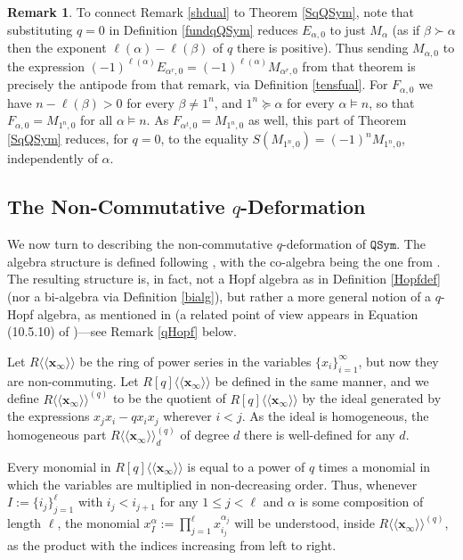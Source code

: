 \documentclass{article}
\theoremstyle{definition}
\newtheorem{rmk}[thm]{Remark}
\begin{document}
\begin{rmk}
To connect Remark \ref{shdual} to Theorem \ref{SqQSym}, note that substituting $q=0$ in Definition \ref{fundqQSym} reduces $E_{\alpha,0}$ to just $M_{\alpha}$ (as if $\beta\succ\alpha$ then the exponent $\ell(\alpha)-\ell(\beta)$ of $q$ there is positive). Thus sending $M_{\alpha,0}$ to the expression $(-1)^{\ell(\alpha)}E_{\alpha^{r},0}=(-1)^{\ell(\alpha)}M_{\alpha^{r},0}$ from that theorem is precisely the antipode from that remark, via Definition \ref{tensfual}. For $F_{\alpha,0}$ we have $n-\ell(\beta)>0$ for every $\beta\neq1^{n}$, and $1^{n}\succeq\alpha$ for every $\alpha \vDash n$, so that $F_{\alpha,0}=M_{1^{n},0}$ for all $\alpha \vDash n$. As $F_{\alpha^{t},0}=M_{1^{n},0}$ as well, this part of Theorem \ref{SqQSym} reduces, for $q=0$, to the equality $S(M_{1^{n},0})=(-1)^{n}M_{1^{n},0}$, independently of $\alpha$. \label{q0com}
\end{rmk}

\subsection{The Non-Commutative $q$-Deformation}

We now turn to describing the non-commutative $q$-deformation of $\mathtt{QSym}$. The algebra structure is defined following \cite{[TU]}, with the co-algebra being the one from \cite{[L]}. The resulting structure is, in fact, not a Hopf algebra as in Definition \ref{Hopfdef} (nor a bi-algebra via Definition \ref{bialg}), but rather a more general notion of a $q$-Hopf algebra, as mentioned in \cite{[L]} (a related point of view appears in Equation (10.5.10) of \cite{[Mo]})---see Remark \ref{qHopf} below.

\medskip

Let $R\langle\langle\mathbf{x}_{\infty}\rangle\rangle$ be the ring of power series in the variables $\{x_{i}\}_{i=1}^{\infty}$, but now they are non-commuting. Let $R[q]\langle\langle\mathbf{x}_{\infty}\rangle\rangle$ be defined in the same manner, and we define $R\langle\langle\mathbf{x}_{\infty}\rangle\rangle^{(q)}$ to be the quotient of $R[q]\langle\langle\mathbf{x}_{\infty}\rangle\rangle$ by the ideal generated by the expressions $x_{j}x_{i}-qx_{i}x_{j}$ wherever $i<j$. As the ideal is homogeneous, the homogeneous part $R\langle\langle\mathbf{x}_{\infty}\rangle\rangle^{(q)}_{d}$ of degree $d$ there is well-defined for any $d$.

Every monomial in $R[q]\langle\langle\mathbf{x}_{\infty}\rangle\rangle$ is equal to a power of $q$ times a monomial in which the variables are multiplied in non-decreasing order. Thus, whenever $I:=\{i_{j}\}_{j=1}^{\ell}$ with $i_{j}<i_{j+1}$ for any $1 \leq j<\ell$ and $\alpha$ is some composition of length $\ell$, the monomial $x_{I}^{\alpha}:=\prod_{j=1}^{\ell}x_{i_{j}}^{\alpha_{j}}$ will be understood, inside $R\langle\langle\mathbf{x}_{\infty}\rangle\rangle^{(q)}$, as the product with the indices increasing from left to right.
\end{document}
